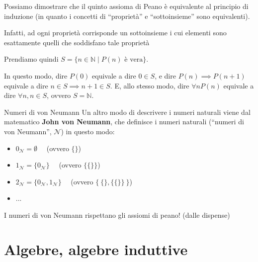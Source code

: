 \documentclass[a4paper,11pt]{report}
\begin{document}
Possiamo dimostrare che il quinto assioma di Peano è equivalente al principio di induzione (in quanto i concetti di ``proprietà'' e ``sottoinsieme'' sono equivalenti).

Infatti, ad ogni proprietà corrisponde un sottoinsieme i cui elementi sono esattamente quelli che soddisfano tale proprietà

Prendiamo quindi \( S = \{n \in \mathbb{N} \mid P(n) \text{ è vera}\}\).

In questo modo, dire \( P(0) \) equivale a dire \( 0 \in S \), e dire \( P(n) \implies P(n+1) \) equivale a dire \( n \in S \implies n+1 \in S \). E, allo stesso modo, dire \( \forall n P(n) \) equivale a dire \( \forall n, n \in S\), ovvero \(S = \mathbb{N} \).


\begin{defframe}{Numeri di von Neumann}{}
    Un altro modo di descrivere i numeri naturali viene dal matematico \textbf{John von Neumann}, che definisce i numeri naturali (``numeri di von Neumann'', \( \mathcal{N} \)) in questo modo:

    \begin{itemize}
        \item \(  0_\mathcal{N} = \emptyset\)  \ \ {\color{gray}(ovvero \( \{ \} \))}

        \item \( 1_\mathcal{N} = \{ 0_\mathcal{N}\}\) \ \ {\color{gray}(ovvero \( \{ \{\}\} \))}
        \item \( 2_\mathcal{N} = \{ 0_\mathcal{N}, 1_\mathcal{N}\}\) \ \ {\color{gray}(ovvero \( \{ \ \{\}, \{\{\}\} \ \}  \))}
        \item ...

    \end{itemize}

    I numeri di von Neumann rispettano gli assiomi di peano! (dalle dispense)

\end{defframe}

\section{Algebre, algebre induttive}
\end{document}
